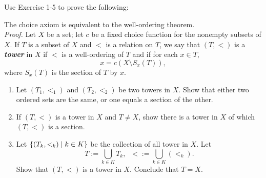 \documentclass[a4paper,12pt]{article}
\begin{document}
\begin{exe}
	Use Exercise 1-5 to prove the following:\leavevmode \par
	\noindent {}\;\;
	The choice axiom is equivalent to the well-ordering theorem.\\
	\textit{Proof.}\;
	Let \( X \) be a set;
	let \( c \) be a fixed choice function for the nonempty subsets of \( X \).
	If \( T \) is a subset of \( X \) and \( < \) is a relation on \( T \),
	we say that \( (T,<) \) is a \textbf{\textit{tower}}
	in \( X \) if \( < \) is a well-ordering of \( T \) and if for each \(  x \in T \),
	\begin{equation}\label{eq:def_tower}
		x=c \left( X \setminus S_x(T) \right),
	\end{equation}
	where \( S_x(T) \) is the section of \( T \) by \( x \).
	\begin{enumerate}
		\item
		      Let \( (T_1,<_1) \) and \( (T_2,<_2) \) be two towers in \( X \).
		      Show that either two ordered sets are the same,
		      or one equals a section of the other.
		      
		\item
		      If \( (T,<) \) is a tower in \( X \) and \( T \neq X \),
		      show there is a tower in \( X \) of which \( (T,<) \) is a section.
		      
		\item
		      Let \( \left\{ (T_k,<_k) \;|\;  k \in K \right\} \)
		      be the collection of all tower in \( X \).
		      Let
		      \begin{equation*}
			      T:=\bigcup_{k \in K} T_k,\;\;<:=\bigcup_{k \in K}\left( <_k \right).
		      \end{equation*}
		      Show that \( (T,<) \) is a tower in \( X \).
		      Conclude that \( T=X \).
	\end{enumerate}
\end{exe}
\end{document}
